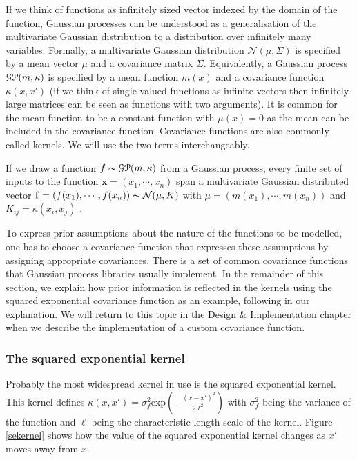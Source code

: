 \documentclass[a4paper,12pt,twoside,openright]{report}
\begin{document}
If we think of functions as infinitely sized vector indexed by the domain of the function, Gaussian processes can be understood as a generalisation of the multivariate Gaussian distribution to a distribution over infinitely many variables. Formally, a multivariate Gaussian distribution $\mathcal{N}(\mu, \Sigma)$ is specified by a mean vector $\mu$ and a covariance matrix $\Sigma$. Equivalently, a Gaussian process $\EuScript{G}\EuScript{P}(m, \kappa)$ is specified by a mean function $m(x)$ and a covariance function $\kappa(x, x')$ (if we think of single valued functions as infinite vectors then infinitely large matrices can be seen as functions with two arguments). It is common for the mean function to be a constant function with $\mu(x) = 0$ as the mean can be included in the covariance function. Covariance functions are also commonly called kernels. We will use the two terms interchangeably.

If we draw a function $f \thicksim \EuScript{G}\EuScript{P}(m, \kappa)$ from a Gaussian process, every finite set of inputs to the function $\mathbf{x} = (x_1, \cdots, x_n)$ span a multivariate Gaussian distributed vector $\mathbf{f} = (f(x_1), \cdots, f(x_n)) \thicksim \mathcal{N}(\mu,K)$ with $\mu = (m(x_1), \cdots, m(x_n))$ and $K_{ij} = \kappa(x_i, x_j)$ \cite{Rasmussen:2005:GPM:1162254}.

To express prior assumptions about the nature of the functions to be modelled, one has to choose a covariance function that expresses these assumptions by assigning appropriate covariances. There is a set of common covariance functions that Gaussian process libraries usually implement. In the remainder of this section, we explain how prior information is reflected in the kernels using the squared exponential covariance function as an example, following \cite{duvenaudthesis} in our explanation. We will return to this topic in the Design \& Implementation chapter when we describe the implementation of a custom covariance function. 

\subsubsection{The squared exponential kernel}
Probably the most widespread kernel in use is the squared exponential kernel. This kernel defines $\kappa(x, x') = \sigma_f^2 \text{exp}(-\frac{(x-x')^2}{2\ell^2})$ with $\sigma_f^2$ being the variance of the function and $\ell$ being the characteristic length-scale of the kernel. Figure \ref{sekernel} shows how the value of the squared exponential kernel changes as $x'$ moves away from $x$. 
\end{document}
